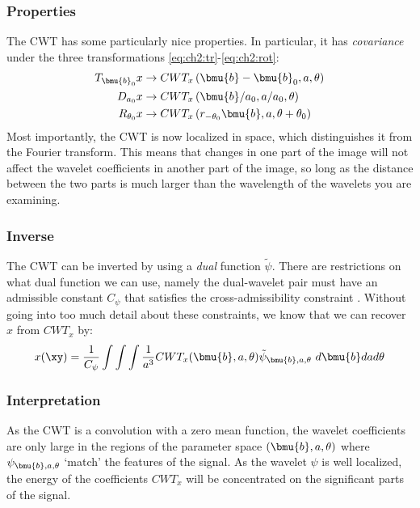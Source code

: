 \subsubsection{Properties} 
The CWT has some particularly nice properties. In particular, it has \emph{covariance} 
under the three transformations \eqref{eq:ch2:tr}-\eqref{eq:ch2:rot}:
\begin{align}
  T_{\bmu{b}_0}x & \rightarrow CWT_x\left(\bmu{b}-\bmu{b}_0, a, \theta \right) \\
  D_{a_0}x & \rightarrow CWT_x\left(\bmu{b}/a_0, a/a_0, \theta \right) \\
  R_{\theta_0}x & \rightarrow CWT_x\left(r_{-\theta_0}\bmu{b}, a, \theta + \theta_0 \right) 
\end{align}
Most importantly, the CWT is now localized in space, which distinguishes it from the
Fourier transform. This means that changes in one part of the image will not
affect the wavelet coefficients in another part of the image, so long as the
distance between the two parts is much larger than the wavelength of the
wavelets you are examining. 

\subsubsection{Inverse}
The CWT can be inverted by using a \emph{dual} function $\tilde{\psi}$. There
are restrictions on what dual function we can use, namely the dual-wavelet pair
must have an admissible constant $C_\psi$ that satisfies the cross-admissibility constraint
\cite{holschneider_pointwise_1991}. Without going into too much detail about
these constraints, we know that we can recover $x$ from $CWT_x$ by:
\begin{equation}
  x(\xy) = \frac{1}{C_\psi} \int \int \int \frac{1}{a^3}CWT_x(\bmu{b}, a, \theta)
  \tilde{\psi}_{\bmu{b}, a, \theta}\ d\bmu{b} da d\theta \label{eq:ch2:invcwt}
\end{equation}

\subsubsection{Interpretation}
As the CWT is a convolution with a zero mean function, the wavelet coefficients are only 
large in the regions of the parameter space $(\bmu{b}, a, \theta)$ where
$\psi_{\bmu{b}, a, \theta}$ `match' the features of the signal. As the wavelet
$\psi$ is well localized, the energy of the coefficients $CWT_x$ will be concentrated 
on the significant parts of the signal.

